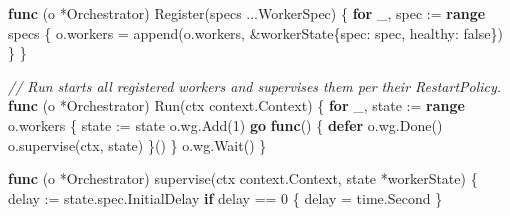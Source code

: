 \documentclass[
]{article}
\newenvironment{Shaded}{}{}
\newcommand{\BuiltInTok}[1]{\textcolor[rgb]{0.00,0.50,0.00}{#1}}
\newcommand{\CommentTok}[1]{\textcolor[rgb]{0.38,0.63,0.69}{\textit{#1}}}
\newcommand{\ControlFlowTok}[1]{\textcolor[rgb]{0.00,0.44,0.13}{\textbf{#1}}}
\newcommand{\DecValTok}[1]{\textcolor[rgb]{0.25,0.63,0.44}{#1}}
\newcommand{\KeywordTok}[1]{\textcolor[rgb]{0.00,0.44,0.13}{\textbf{#1}}}
\newcommand{\NormalTok}[1]{#1}
\newcommand{\OperatorTok}[1]{\textcolor[rgb]{0.40,0.40,0.40}{#1}}
\newcommand{\OtherTok}[1]{\textcolor[rgb]{0.00,0.44,0.13}{#1}}
\begin{document}
\begin{Shaded}
\begin{Highlighting}[]
\KeywordTok{func} \OperatorTok{(}\NormalTok{o }\OperatorTok{*}\NormalTok{Orchestrator}\OperatorTok{)}\NormalTok{ Register}\OperatorTok{(}\NormalTok{specs }\OperatorTok{...}\NormalTok{WorkerSpec}\OperatorTok{)} \OperatorTok{\{}
    \ControlFlowTok{for}\NormalTok{ \_}\OperatorTok{,}\NormalTok{ spec }\OperatorTok{:=} \KeywordTok{range}\NormalTok{ specs }\OperatorTok{\{}
\NormalTok{        o}\OperatorTok{.}\NormalTok{workers }\OperatorTok{=} \BuiltInTok{append}\OperatorTok{(}\NormalTok{o}\OperatorTok{.}\NormalTok{workers}\OperatorTok{,} \OperatorTok{\&}\NormalTok{workerState}\OperatorTok{\{}\NormalTok{spec}\OperatorTok{:}\NormalTok{ spec}\OperatorTok{,}\NormalTok{ healthy}\OperatorTok{:} \OtherTok{false}\OperatorTok{\})}
    \OperatorTok{\}}
\OperatorTok{\}}

\CommentTok{// Run starts all registered workers and supervises them per their RestartPolicy.}
\KeywordTok{func} \OperatorTok{(}\NormalTok{o }\OperatorTok{*}\NormalTok{Orchestrator}\OperatorTok{)}\NormalTok{ Run}\OperatorTok{(}\NormalTok{ctx context}\OperatorTok{.}\NormalTok{Context}\OperatorTok{)} \OperatorTok{\{}
    \ControlFlowTok{for}\NormalTok{ \_}\OperatorTok{,}\NormalTok{ state }\OperatorTok{:=} \KeywordTok{range}\NormalTok{ o}\OperatorTok{.}\NormalTok{workers }\OperatorTok{\{}
\NormalTok{        state }\OperatorTok{:=}\NormalTok{ state}
\NormalTok{        o}\OperatorTok{.}\NormalTok{wg}\OperatorTok{.}\NormalTok{Add}\OperatorTok{(}\DecValTok{1}\OperatorTok{)}
        \ControlFlowTok{go} \KeywordTok{func}\OperatorTok{()} \OperatorTok{\{}
            \ControlFlowTok{defer}\NormalTok{ o}\OperatorTok{.}\NormalTok{wg}\OperatorTok{.}\NormalTok{Done}\OperatorTok{()}
\NormalTok{            o}\OperatorTok{.}\NormalTok{supervise}\OperatorTok{(}\NormalTok{ctx}\OperatorTok{,}\NormalTok{ state}\OperatorTok{)}
        \OperatorTok{\}()}
    \OperatorTok{\}}
\NormalTok{    o}\OperatorTok{.}\NormalTok{wg}\OperatorTok{.}\NormalTok{Wait}\OperatorTok{()}
\OperatorTok{\}}

\KeywordTok{func} \OperatorTok{(}\NormalTok{o }\OperatorTok{*}\NormalTok{Orchestrator}\OperatorTok{)}\NormalTok{ supervise}\OperatorTok{(}\NormalTok{ctx context}\OperatorTok{.}\NormalTok{Context}\OperatorTok{,}\NormalTok{ state }\OperatorTok{*}\NormalTok{workerState}\OperatorTok{)} \OperatorTok{\{}
\NormalTok{    delay }\OperatorTok{:=}\NormalTok{ state}\OperatorTok{.}\NormalTok{spec}\OperatorTok{.}\NormalTok{InitialDelay}
    \ControlFlowTok{if}\NormalTok{ delay }\OperatorTok{==} \DecValTok{0} \OperatorTok{\{}
\NormalTok{        delay }\OperatorTok{=}\NormalTok{ time}\OperatorTok{.}\NormalTok{Second}
    \OperatorTok{\}}


\end{Highlighting}
\end{Shaded}
\end{document}
